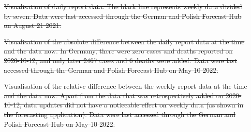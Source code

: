 \documentclass[10pt,letterpaper]{article}
\providecommand{\DIFdeltex}[1]{{\protect\color{red}\sout{#1}}}                      %
\providecommand{\DIFdelFL}[1]{\DIFdel{#1}} %
\providecommand{\DIFdel}[1]{\texorpdfstring{\DIFdeltex{#1}}{}} %
\begin{document}


{%
\DIFdelFL{Visualisation of daily report data. The black line represents weekly data divided by seven. Data were last accessed through the German and Polish Forecast Hub on August 21 2021.}}%

{%
\DIFdelFL{Visualisation of the absolute difference between the daily report data at the time and the data now. In Germany, there were zero cases and deaths reported on 2020-10-12, and only later 2467 cases and 6 deaths were added. Data were last accessed through the German and Polish Forecast Hub on May 10 2022.}}%

{%
\DIFdelFL{Visualisation of the relative difference between the weekly report data at the time and the data now. Apart from the data that was retrospectively added on 2020-10-12, data updates did not have a noticeable effect on weekly data (as shown in the forecasting application). Data were last accessed through the German and Polish Forecast Hub on May 10 2022.}}%

\end{document}
